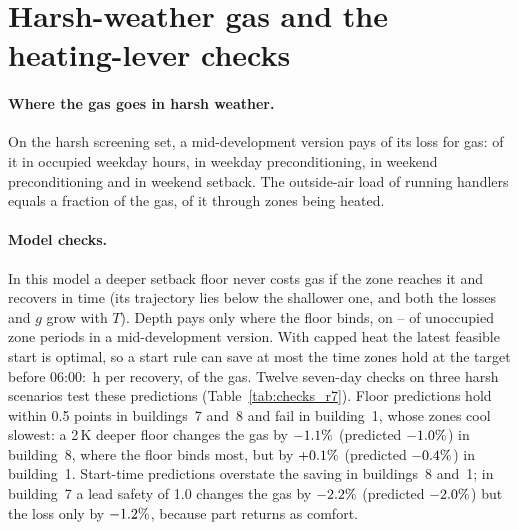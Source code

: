 \documentclass{article}
\begin{document}
\section{Harsh-weather gas and the heating-lever checks}
\label{app:levers}
\paragraph{Where the gas goes in harsh weather.} On the harsh screening set, a mid-development version pays \RSixDecGas{} of its loss for gas: \RSixDecOccWd{} of it in occupied weekday hours, \RSixDecPreWd{} in weekday preconditioning, \RSixDecPreWe{} in weekend preconditioning and \RSixDecSbWe{} in weekend setback. The outside-air load of running handlers equals a fraction \RSixDecVent{} of the gas, \RSixDecVentHeated{} of it through zones being heated.

\paragraph{Model checks.} In this model a deeper setback floor never costs gas if the zone reaches it and recovers in time (its trajectory lies below the shallower one, and both the losses and $g$ grow with $T$). Depth pays only where the floor binds, on \RSevBindLo--\RSevBindHi{} of unoccupied zone periods in a mid-development version. With capped heat the latest feasible start is optimal, so a start rule can save at most the time zones hold at the target before 06:00: \RSevHoldH\,h per recovery, \RSevHoldGas{} of the gas. Twelve seven-day checks on three harsh scenarios test these predictions (Table~\ref{tab:checks_r7}). Floor predictions hold within 0.5 points in buildings~7 and~8 and fail in building~1, whose zones cool slowest: a 2\,K deeper floor changes the gas by $-1.1\%$ (predicted $-1.0\%$) in building~8, where the floor binds most, but by $+0.1\%$ (predicted $-0.4\%$) in building~1. Start-time predictions overstate the saving in buildings~8 and~1; in building~7 a lead safety of 1.0 changes the gas by $-2.2\%$ (predicted $-2.0\%$) but the loss only by $-1.2\%$, because part returns as comfort.
\end{document}
